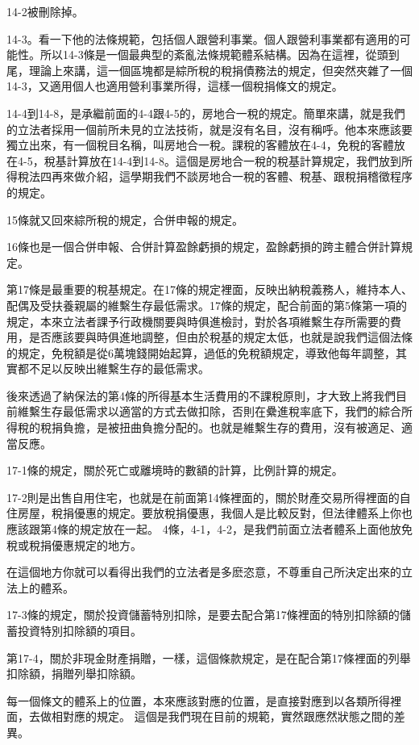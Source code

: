 \documentclass[]{ctexbook}
\begin{document}
14-2被刪除掉。

14-3。看一下他的法條規範，包括個人跟營利事業。個人跟營利事業都有適用的可能性。所以14-3條是一個最典型的紊亂法條規範體系結構。因為在這裡，從頭到尾，理論上來講，這一個區塊都是綜所稅的稅捐債務法的規定，但突然夾雜了一個14-3，又適用個人也適用營利事業所得，這樣一個稅捐條文的規定。

14-4到14-8，是承繼前面的4-4跟4-5的，房地合一稅的規定。簡單來講，就是我們的立法者採用一個前所未見的立法技術，就是沒有名目，沒有稱呼。他本來應該要獨立出來，有一個稅目名稱，叫房地合一稅。課稅的客體放在4-4，免稅的客體放在4-5，稅基計算放在14-4到14-8。這個是房地合一稅的稅基計算規定，我們放到所得稅法四再來做介紹，這學期我們不談房地合一稅的客體、稅基、跟稅捐稽徵程序的規定。

15條就又回來綜所稅的規定，合併申報的規定。

16條也是一個合併申報、合併計算盈餘虧損的規定，盈餘虧損的跨主體合併計算規定。

第17條是最重要的稅基規定。在17條的規定裡面，反映出納稅義務人，維持本人、配偶及受扶養親屬的維繫生存最低需求。17條的規定，配合前面的第5條第一項的規定，本來立法者課予行政機關要與時俱進檢討，對於各項維繫生存所需要的費用，是否應該要與時俱進地調整，但由於稅基的規定太低，也就是說我們這個法條的規定，免稅額是從6萬塊錢開始起算，過低的免稅額規定，導致他每年調整，其實都不足以反映出維繫生存的最低需求。

後來透過了納保法的第4條的所得基本生活費用的不課稅原則，才大致上將我們目前維繫生存最低需求以適當的方式去做扣除，否則在纍進稅率底下，我們的綜合所得稅的稅捐負擔，是被扭曲負擔分配的。也就是維繫生存的費用，沒有被適足、適當反應。

17-1條的規定，關於死亡或離境時的數額的計算，比例計算的規定。

17-2則是出售自用住宅，也就是在前面第14條裡面的，關於財產交易所得裡面的自住房屋，稅捐優惠的規定。要放稅捐優惠，我個人是比較反對，但法律體系上你也應該跟第4條的規定放在一起。
4條，4-1，4-2，是我們前面立法者體系上面他放免稅或稅捐優惠規定的地方。

在這個地方你就可以看得出我們的立法者是多麽恣意，不尊重自己所決定出來的立法上的體系。

17-3條的規定，關於投資儲蓄特別扣除，是要去配合第17條裡面的特別扣除額的儲蓄投資特別扣除額的項目。

第17-4，關於非現金財產捐贈，一樣，這個條款規定，是在配合第17條裡面的列舉扣除額，捐贈列舉扣除額。

每一個條文的體系上的位置，本來應該對應的位置，是直接對應到以各類所得裡面，去做相對應的規定。
這個是我們現在目前的規範，實然跟應然狀態之間的差異。
\end{document}
